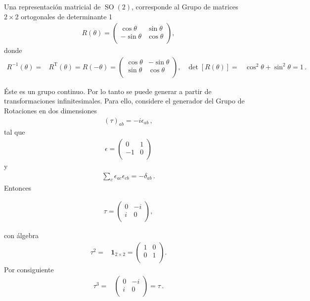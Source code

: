 \begin{frame}
Una representación matricial de $\operatorname{SO}(2)$, corresponde al Grupo de matrices $2\times 2$ ortogonales de determinante 1
\begin{align*}
  R(\theta)=
  \begin{pmatrix}
  \cos\theta &\sin\theta\\  
  -\sin\theta&\cos\theta\\  
  \end{pmatrix},
\end{align*}
donde
\begin{align*}
  R^{-1}(\theta)=& R^{\operatorname{T}}(\theta)=R(-\theta)
=
  \begin{pmatrix}
  \cos\theta &-\sin\theta\\  
  \sin\theta&\cos\theta\\  
  \end{pmatrix}, & \det[R(\theta)]=&\cos^2\theta+\sin^2\theta=1\,.
\end{align*}

Éste es  un grupo continuo. Por lo tanto se puede generar a partir de transformaciones infinitesimales.
Para ello,
considere el generador del Grupo de Rotaciones en dos dimensiones
\begin{align}
  \label{eq:ieab}
(\tau)_{ab}=-i \epsilon_{ab}\,, 
\end{align}
tal que
\begin{align}
  \epsilon=
  \begin{pmatrix}
    0 & 1 \\
    -1 & 0\\
  \end{pmatrix}
\end{align}
y
\begin{align*}
\sum_c \epsilon_{ac}\epsilon_{cb}=-\delta_{ab}\,.
\end{align*}
Entonces  

\begin{align}
  \label{eq:so2g}
  \tau=
  \begin{pmatrix}
   0 & -i \\
   i & 0 \\    
  \end{pmatrix},
\end{align}
\end{frame}
con álgebra
\begin{align}
  \tau^2=&\boldsymbol{1}_{2\times2}=
  \begin{pmatrix}
    1 & 0\\
    0 & 1\\
  \end{pmatrix}. 
\end{align}
Por consiguiente
\begin{align*}
  \tau^3=&  \begin{pmatrix}
    0 & -i\\
    i & 0\\
  \end{pmatrix}=\tau\,.
\end{align*}

